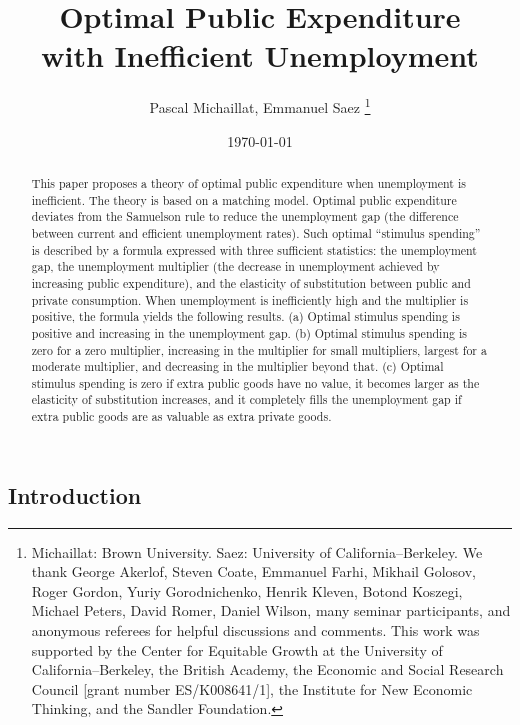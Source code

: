\documentclass[letterpaper,12pt,leqno]{article}
\begin{document}
\title{Optimal Public Expenditure\\with Inefficient Unemployment}
\author{Pascal Michaillat, Emmanuel Saez%
\thanks{Michaillat: Brown University. Saez: University of California--Berkeley. We thank George Akerlof, Steven Coate, Emmanuel Farhi, Mikhail Golosov, Roger Gordon, Yuriy Gorodnichenko, Henrik Kleven, Botond Koszegi, Michael Peters, David Romer, Daniel Wilson, many seminar participants, and anonymous referees for helpful discussions and comments. This work was supported by the Center for Equitable Growth at the University of California--Berkeley, the British Academy, the Economic and Social Research Council [grant number ES/K008641/1], the Institute for New Economic Thinking, and the Sandler Foundation.}}
\date{\today}

\begin{titlepage}\maketitle\begin{abstract}

This paper proposes a theory of optimal public expenditure when unemployment is inefficient. The theory is based on a matching model. Optimal public expenditure deviates from the Samuelson rule to reduce the unemployment gap (the difference between current and efficient unemployment rates). Such optimal ``stimulus spending'' is described by a formula expressed with three sufficient statistics: the unemployment gap, the unemployment multiplier (the decrease in unemployment achieved by increasing public expenditure), and the elasticity of substitution between public and private consumption. When unemployment is inefficiently high and the multiplier is positive, the formula yields the following results. (a) Optimal stimulus spending is positive and increasing in the unemployment gap. (b) Optimal stimulus spending is zero for a zero multiplier, increasing in the multiplier for small multipliers, largest for a moderate multiplier, and decreasing in the multiplier beyond that. (c) Optimal stimulus spending is zero if extra public goods have no value, it becomes larger as the elasticity of substitution increases, and it completely fills the unemployment gap if extra public goods are as valuable as extra private goods.

\end{abstract}\end{titlepage}\begin{bibunit}\section{Introduction}


\end{bibunit}
\end{document}
